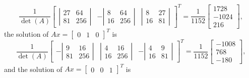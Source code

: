 \documentclass{homework}
\begin{document}
	\begin{equation}
		\frac{1}{\det(A)}\left[\begin{matrix}
			\left|\begin{matrix}
				27 & 64 \\ 81 & 256
			\end{matrix}\right| &
			-\left|\begin{matrix}
				8 & 64 \\ 16 & 256
			\end{matrix}\right| &
			\left|\begin{matrix}
				8 & 27 \\ 16 & 81
			\end{matrix}\right|
		\end{matrix}\right]^T = \frac{1}{1152} \left[\begin{matrix}
		1728 \\ -1024 \\ 216
		\end{matrix}\right],
	\end{equation}
	the solution of $Ax = [\begin{matrix}0&1&0\end{matrix}]^T$ is 
	\begin{equation}
		\frac{1}{\det(A)}\left[\begin{matrix}
			-\left|\begin{matrix}
				9 & 16 \\ 81 & 256
			\end{matrix}\right| &
			\left|\begin{matrix}
				4 & 16 \\ 16 & 256
			\end{matrix}\right| &
			-\left|\begin{matrix}
				4 & 9 \\ 16 & 81
			\end{matrix}\right|
		\end{matrix}\right]^T = \frac{1}{1152} \left[\begin{matrix}
			-1008 \\ 768 \\ -180
		\end{matrix}\right],
	\end{equation}
	and the solution of $Ax = [\begin{matrix}0&0&1\end{matrix}]^T$ is 
\end{document}
